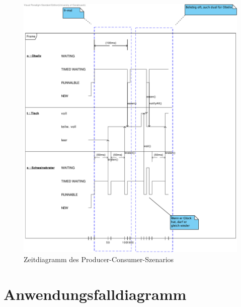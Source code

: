 \documentclass{scrartcl}
\begin{document}
\begin{figure}
   {\centering      
   \includegraphics[width=\linewidth]{Wildschwein.pdf}
   \caption{Zeitdiagramm des Producer-Consumer-Szenarios}
   \label{wildschwein}}
\end{figure}

\section{Anwendungsfalldiagramm}
\end{document}
